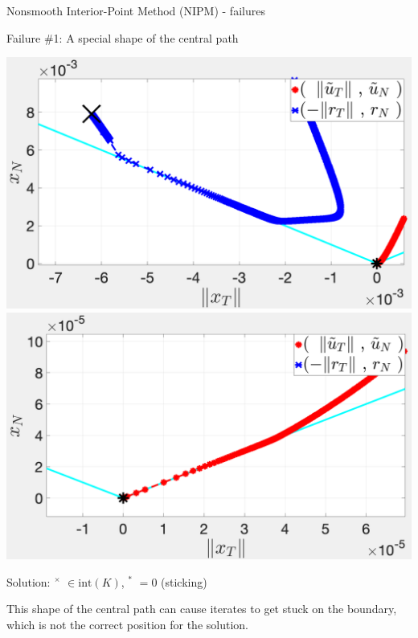 \begin{frame}{Nonsmooth Interior-Point Method (NIPM) - failures}
    \vspace{-0.1cm}
    \begin{exampleblock}{Failure \#1: {\color{black} A special shape of the central path}}
        \begin{center}
            \includegraphics[width=0.495\linewidth]{./figure/IPM/images/ncv_fail1a.png}
            \includegraphics[width=0.495\linewidth]{./figure/IPM/images/ncv_fail1b.png}
        \end{center}
        \begin{center}
        Solution: $^\times${\color{blue} $\in \mbox{int}({K})$}, $^*${\color{red} $= 0$} \quad (sticking)
        \end{center}
    \end{exampleblock}
    This shape of the central path can cause iterates to get stuck on the boundary, which is not the correct position for the solution.
\end{frame}




